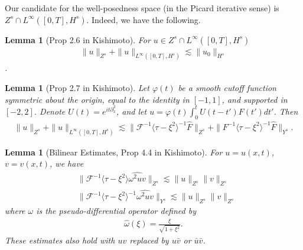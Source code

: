 \documentclass{amsart}
\newtheorem{lemma}[theorem]{Lemma}
\newcommand{\wh}{\widehat}
\newcommand{\vp}{\varphi}
\newcommand{\p}{\partial}
\begin{document}
%
%
Our candidate for the well-posedness space (in the Picard iterative sense) is
$Z^{s} \cap L^{\infty}\left( [0, T], H^{s} \right)$. Indeed, we have the
following.
%
%
%
%
%
%
%
%
%
%
\begin{lemma}[Prop 2.6 in Kishimoto]
  For $u \in Z^{s} \cap L^{\infty}\left( [0,T], H^{s} \right)$
  \begin{equation*}
  \begin{split}
    \| u \|_{Z^{s}} + \| u \|_{L^{\infty}\left( [0,T], H^{s} \right)} \lesssim
    \| u_{0} \|_{H^{s}}
  \end{split}
  \end{equation*}
\label{lem:init-data-b}.
\end{lemma}
%
%
%
%
%
%
%                
%
%
%
%
\begin{lemma}[Prop 2.7 in Kishimoto]
  Let $\vp(t)$ be a smooth cutoff
  function symmetric about the origin, equal to the identity in $[-1, 1]$, and
  supported in $[-2,2]$. Denote $U(t) = e^{it \p_{x}^{2}}$, and let 
  $u = \vp(t) \int_{0}^{t} U(t - t') F(t') dt'$. Then
  \begin{equation*}
  \begin{split}
    \| u \|_{Z^{s}} + \| u \|_{L^{\infty}\left( [0,T], H^{s} \right)} \lesssim
    \| \mathcal{F}^{-1} \langle \tau - \xi^{2} \rangle ^{-1} \wh{F}
    \|_{Z^{s}} + \| F^{-1}\langle \tau - \xi^{2} \rangle^{-1} \wh{F}
    \|_{Y^{s}}.
  \end{split}
  \end{equation*}
  \label{lem:non-lin-to-bilin}
\end{lemma}
%
%
%
%
%
%
%
%
%
%
\begin{lemma}[Bilinear Estimates, Prop 4.4 in Kishimoto]
For $u = u(x,t)$, $v = v(x,t)$, we have
%
%
\begin{equation*}
\begin{split}
  & \|\mathcal{F}^{-1} \langle \tau - \xi^{2} \rangle \wh{\omega^{2} uv}
  \|_{Z^{s}} \lesssim \| u \|_{Z^{s}} \|v \|_{Z^{s}}
  \\
  & \| \mathcal{F}^{-1} \langle \tau - \xi^{2} \rangle ^{-1} \wh{\omega^{2} uv}
  \|_{Y^{s}} \lesssim \| u \|_{Z^{s}} \| v \|_{Z^{s}}
\end{split}
\end{equation*}
%
where $\omega$ is the pseudo-differential operator defined by
%
%
\begin{equation*}
\begin{split}
  \wh{\omega}(\xi) = \frac{\xi}{ \sqrt{1 + \xi^{2}}}.
\end{split}
\end{equation*}
%
%
These estimates also hold with $uv$ replaced by $u \bar v$ or $\bar u \bar v$.
%
\label{lem:bilinear-estimates}
\end{lemma}
\end{document}
